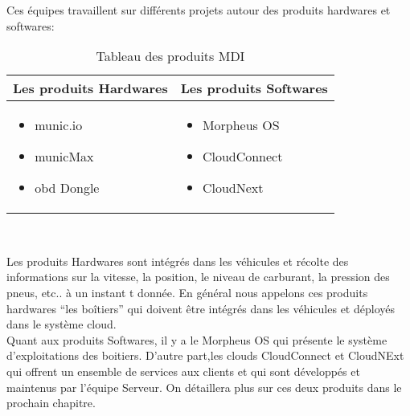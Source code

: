         Ces équipes travaillent sur différents projets autour des produits hardwares et softwares: 
            \begin{table}[h!]
                \centering
                \begin{tabular}{|p{5cm}|p{5cm}|}
                    \hline   Les produits Hardwares & Les produits Softwares \\
                    \hline
                    \begin{itemize}
                        \renewcommand{\labelitemi}{$\bullet$}
                        \item munic.io
                        \item municMax
                        \item \gls{obd} Dongle
                    \end{itemize} 
                   & 
                    \begin{itemize}
                        \renewcommand{\labelitemi}{$\bullet$}
                        \item Morpheus OS
                        \item CloudConnect
                        \item CloudNext
                    \end{itemize}\\
                    \hline 
                \end{tabular}
                \caption{Tableau des produits MDI}
                \label{table:1}
            \end{table} \\

            \vspace{0.3cm}

            Les produits Hardwares sont intégrés dans les véhicules et récolte des informations sur 
            la vitesse, la position, le niveau de carburant, la pression des pneus, etc..  à un instant t donnée.
            En général nous appelons ces produits hardwares “les boîtiers” qui doivent être intégrés dans 
            les véhicules et déployés  dans le système cloud. \\ [0.1cm]
            Quant aux produits Softwares, il y a le Morpheus OS qui présente le système d'exploitations des boitiers. 
            D'autre part,les clouds CloudConnect et CloudNExt qui offrent un ensemble de services aux clients 
            et qui sont développés et maintenus par l'équipe Serveur. On détaillera plus sur ces deux produits dans le prochain chapitre. 
       
